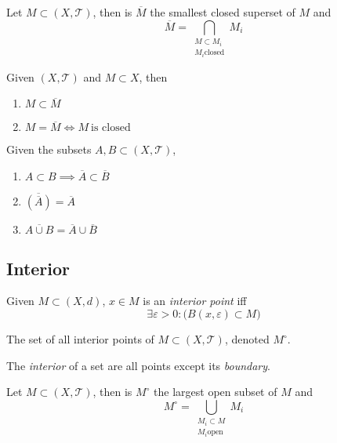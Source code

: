 \begin{theorem}
   Let \(M \subset (X, \mathcal{T})\), then is \(\overline{M}\) the smallest closed superset of \(M\) and
   \[\overline{M} = \bigcap_{\substack{M \subset M_i\\ M_i \text{closed}}} M_i\]
\end{theorem}

\begin{theorem}
   Given \((X, \mathcal{T})\) and \(M \subset X\), then
   \begin{enumerate}[label=\roman*, align=Center]
      \item \(M \subset \overline{M}\)
      \item \(M = \overline{M} \iff M~\text{is closed}\)
   \end{enumerate}
\end{theorem}

\begin{proposition}
   Given the subsets \(A, B \subset (X, \mathcal{T})\),
   \begin{enumerate}[label=\roman*, align=Center]
      \item \(A \subset B \implies \overline{A} \subset \overline{B}\)
      \item \(\overline{(\overline{A})} = \overline{A}\)
      \item \(\overline{A \cup B} = \overline{A} \cup \overline{B}\)
   \end{enumerate}
\end{proposition}

\subsection{Interior}
\begin{definition}
   Given \(M \subset (X, d)\), \(x \in M\) is an \emph{interior point} iff
   \[\exists \varepsilon > 0: \big(B(x, \varepsilon) \subset M\big)\]
\end{definition}

\begin{definition}
   The set of all interior points of \(M \subset (X, \mathcal{T})\), denoted \(M^\circ\).
\end{definition}
\begin{remark}[Intuition]
   The \emph{interior} of a set are all points except its \emph{boundary}.
\end{remark}

\begin{theorem}
   Let \(M \subset (X, \mathcal{T})\), then is \(M^\circ\) the largest open subset of \(M\) and
   \[M^\circ = \bigcup_{\substack{M_i \subset M\\ M_i \text{open}}} M_i\]
\end{theorem}

